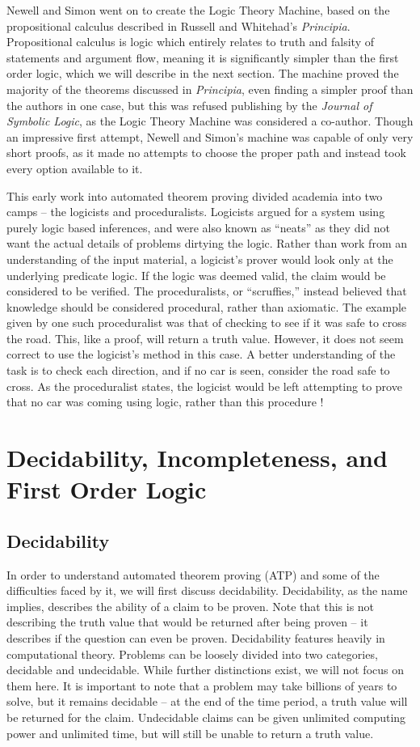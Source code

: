 Newell and Simon went on to create the Logic Theory Machine, based on the propositional calculus described in Russell and Whitehad's \textit{Principia}. Propositional calculus is logic which entirely relates to truth and falsity of statements and argument flow, meaning it is significantly simpler than the first order logic, which we will describe in the next section. The machine proved the majority of the theorems discussed in \textit{Principia}, even finding a simpler proof than the authors in one case, but this was refused publishing by the \textit{Journal of Symbolic Logic}, as the Logic Theory Machine was considered a co-author. Though an impressive first attempt, Newell and Simon's machine was capable of only very short proofs, as it made no attempts to choose the proper path and instead took every option available to it.

This early work into automated theorem proving divided academia into two camps -- the logicists and proceduralists. Logicists argued for a system using purely logic based inferences, and were also known as ``neats'' as they did not want the actual details of problems dirtying the logic. Rather than work from an understanding of the input material, a logicist's prover would look only at the underlying predicate logic. If the logic was deemed valid, the claim would be considered to be verified. The proceduralists, or ``scruffies,'' instead believed that knowledge should be considered procedural, rather than axiomatic. The example given by one such proceduralist was that of checking to see if it was safe to cross the road. This, like a proof, will return a truth value. However, it does not seem correct to use the logicist's method in this case. A better understanding of the task is to check each direction, and if no car is seen, consider the road safe to cross. As the proceduralist states, the logicist would be left attempting to prove that no car was coming using logic, rather than this procedure \cite{history}!

\section{Decidability, Incompleteness, and First Order Logic}
\subsection{Decidability}
In order to understand automated theorem proving (ATP) and some of the difficulties faced by it, we will first discuss decidability. Decidability, as the name implies, describes the ability of a claim to be proven. Note that this is not describing the truth value that would be returned after being proven -- it describes if the question can even be proven. 
Decidability features heavily in computational theory. Problems can be loosely divided into two categories, decidable and undecidable. While further distinctions exist, we will not focus on them here. It is important to note that a problem may take billions of years to solve, but it remains decidable -- at the end of the time period, a truth value will be returned for the claim. Undecidable claims can be given unlimited computing power and unlimited time, but will still be unable to return a truth value.

